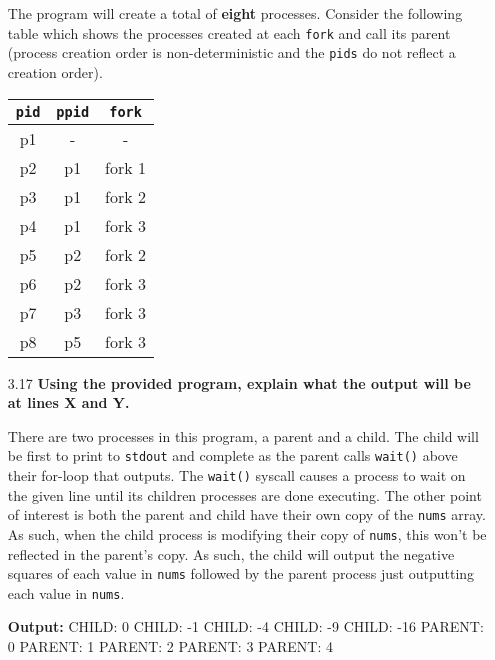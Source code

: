 \documentclass[fleqn]{hw}
\begin{document}
\begin{enumerate}
The program will create a total of \textbf{eight} processes. Consider the following table which shows the processes created at each \texttt{fork} and call its parent (process creation order is non-deterministic and the \texttt{pids} do not reflect a creation order).

\begin{table}[H]
\centering
{\renewcommand{\arraystretch}{1.2}%
\begin{tabular}{| c | c | c |}
\hline
\texttt{pid} & \texttt{ppid} & \texttt{fork} \\
\hline
p1 & - & - \\ \hline
p2 & p1 & fork 1 \\ \hline
p3 & p1 & fork 2 \\ \hline
p4 & p1 & fork 3 \\ \hline
p5 & p2 & fork 2 \\ \hline
p6 & p2 & fork 3 \\ \hline
p7 & p3 & fork 3 \\ \hline
p8 & p5 & fork 3 \\ \hline
\end{tabular}}
\end{table}

\item [3.17] \textbf{Using the provided program, explain what the output will be at lines X and Y.}

There are two processes in this program, a parent and a child. The child will be first to print to \texttt{stdout} and complete as the parent calls \texttt{wait()} above their for-loop that outputs. The \texttt{wait()} syscall causes a process to wait on the given line until its children processes are done executing. The other point of interest is both the parent and child have their own copy of the \texttt{nums} array. As such, when the child process is modifying their copy of \texttt{nums}, this won't be reflected in the parent's copy. As such, the child will output the negative squares of each value in \texttt{nums} followed by the parent process just outputting each value in \texttt{nums}.

\textbf{Output:} CHILD: 0 CHILD: -1 CHILD: -4 CHILD: -9 CHILD: -16 PARENT: 0 PARENT: 1 PARENT: 2 PARENT: 3 PARENT: 4

\end{enumerate}
\end{document}
